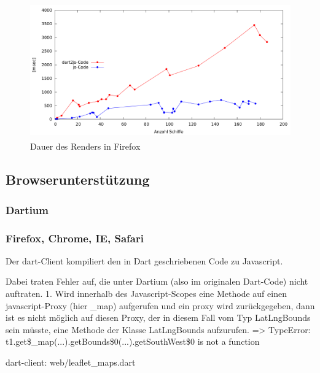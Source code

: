 \begin {figure}[H]
\begin{center}
  \includegraphics[height=2.3in]{images/Firefox.png}
\end{center}
 \caption{Dauer des Renders in Firefox}
\end {figure}


\subsection{Browserunterstützung}
\subsubsection{Dartium}

\subsubsection{Firefox, Chrome, IE, Safari}

Der dart-Client kompiliert den in Dart geschriebenen Code zu Javascript.

Dabei traten Fehler auf, die unter Dartium (also im originalen Dart-Code) nicht auftraten.
1. Wird innerhalb des Javascript-Scopes eine Methode auf einen javascript-Proxy (hier \_map) aufgerufen und ein proxy wird zurückgegeben, dann ist es nicht möglich auf diesen Proxy, der in diesem Fall vom Typ LatLngBounds sein müsste, eine Methode der Klasse LatLngBounds aufzurufen. => TypeError: t1.get\$\_map(...).getBounds\$0(...).getSouthWest\$0 is not a function

dart-client: web/leaflet\_maps.dart

